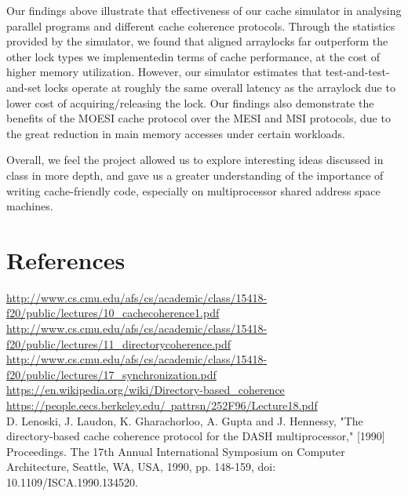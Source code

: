 \documentclass{article}
\begin{document}
Our findings above illustrate that effectiveness of our cache simulator in analysing parallel programs and different cache coherence protocols.  Through the statistics provided by the simulator, we found that aligned arraylocks far outperform the other lock types we implementedin terms of cache performance, at the cost of higher memory utilization.  However, our simulator estimates that test-and-test-and-set locks operate at roughly the same overall latency as the arraylock due to lower cost of acquiring/releasing the lock.  Our findings also demonstrate the benefits of the MOESI cache protocol over the MESI and MSI protocols, due to the great reduction in main memory accesses under certain workloads.

Overall, we feel the project allowed us to explore interesting ideas discussed in class in more depth, and gave us a greater understanding of the importance of writing cache-friendly code, especially on multiprocessor shared address space machines.


\section{References}
\href{http://www.cs.cmu.edu/afs/cs/academic/class/15418-f20/public/lectures/10\_cachecoherence1.pdf}{http://www.cs.cmu.edu/afs/cs/academic/class/15418-f20/public/lectures/10\_cachecoherence1.pdf} \\
\href{http://www.cs.cmu.edu/afs/cs/academic/class/15418-f20/public/lectures/11\_directorycoherence.pdf}{http://www.cs.cmu.edu/afs/cs/academic/class/15418-f20/public/lectures/11\_directorycoherence.pdf} \\
\href{http://www.cs.cmu.edu/afs/cs/academic/class/15418-f20/public/lectures/17\_synchronization.pdf}{http://www.cs.cmu.edu/afs/cs/academic/class/15418-f20/public/lectures/17\_synchronization.pdf} \\
\href{https://en.wikipedia.org/wiki/Directory-based\_coherence}{https://en.wikipedia.org/wiki/Directory-based\_coherence} \\
\href{https://people.eecs.berkeley.edu/~pattrsn/252F96/Lecture18.pdf}{https://people.eecs.berkeley.edu/~pattrsn/252F96/Lecture18.pdf} \\

D. Lenoski, J. Laudon, K. Gharachorloo, A. Gupta and J. Hennessy, "The directory-based cache coherence protocol for the DASH multiprocessor," [1990] Proceedings. The 17th Annual International Symposium on Computer Architecture, Seattle, WA, USA, 1990, pp. 148-159, doi: 10.1109/ISCA.1990.134520.
\end{document}
